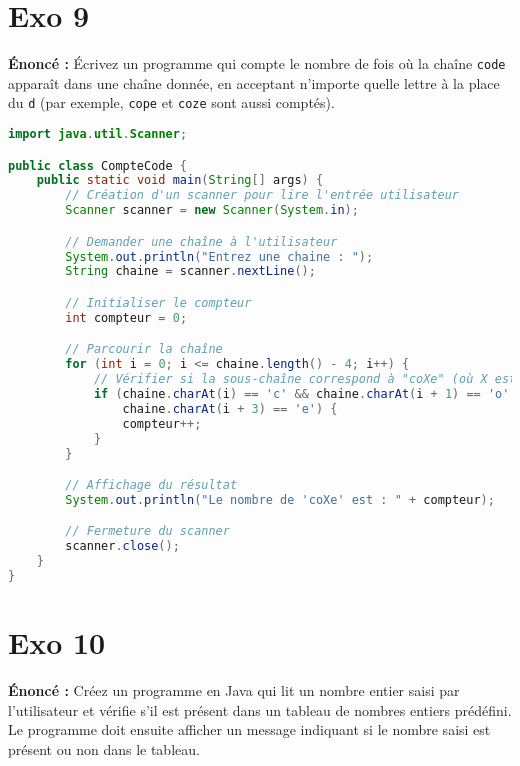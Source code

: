 \documentclass{article}
\begin{document}
\section*{Exo 9}
\noindent \textbf{Énoncé :} Écrivez un programme qui compte le nombre de fois o\`u la cha\^ine \texttt{code} apparaît dans une cha\^ine donn\'ee, en acceptant n'importe quelle lettre \`a la place du \texttt{d} (par exemple, \texttt{cope} et \texttt{coze} sont aussi comptés).

\begin{lstlisting}[language=Java]
import java.util.Scanner;

public class CompteCode {
    public static void main(String[] args) {
        // Création d'un scanner pour lire l'entrée utilisateur
        Scanner scanner = new Scanner(System.in);

        // Demander une chaîne à l'utilisateur
        System.out.println("Entrez une chaine : ");
        String chaine = scanner.nextLine();

        // Initialiser le compteur
        int compteur = 0;

        // Parcourir la chaîne
        for (int i = 0; i <= chaine.length() - 4; i++) {
            // Vérifier si la sous-chaîne correspond à "coXe" (où X est une lettre)
            if (chaine.charAt(i) == 'c' && chaine.charAt(i + 1) == 'o' &&
                chaine.charAt(i + 3) == 'e') {
                compteur++;
            }
        }

        // Affichage du résultat
        System.out.println("Le nombre de 'coXe' est : " + compteur);

        // Fermeture du scanner
        scanner.close();
    }
}
\end{lstlisting}
\clearpage

\section*{Exo 10}
\noindent \textbf{Énoncé :} Créez un programme en Java qui lit un nombre entier saisi par l'utilisateur et vérifie s'il est présent dans un tableau de nombres entiers prédéfini. Le programme doit ensuite afficher un message indiquant si le nombre saisi est présent ou non dans le tableau.
\end{document}
